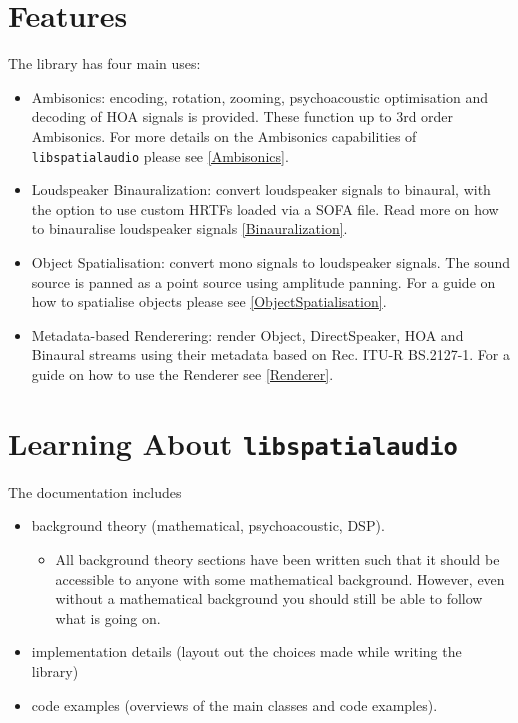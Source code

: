 \documentclass[12pt]{report}
\def\libspataud{\texttt{libspatialaudio}\xspace}
\begin{document}
\section{Features}

The library has four main uses:
\begin{itemize}
    \item Ambisonics: encoding, rotation, zooming, psychoacoustic optimisation and decoding of HOA signals is provided. These function up to 3rd order Ambisonics. For more details on the Ambisonics capabilities of \libspataud please see \cref{Ambisonics}.
    \item Loudspeaker Binauralization: convert loudspeaker signals to binaural, with the option to use custom HRTFs loaded via a SOFA file. Read more on how to binauralise loudspeaker signals \cref{Binauralization}.
    \item Object Spatialisation: convert mono signals to loudspeaker signals. The sound source is panned as a point source using amplitude panning. For a guide on how to spatialise objects please see \cref{ObjectSpatialisation}.
    \item Metadata-based Renderering: render Object, DirectSpeaker, HOA and Binaural streams using their metadata based on Rec. ITU-R BS.2127-1. For a guide on how to use the Renderer see \cref{Renderer}.
\end{itemize}

\section{Learning About \libspataud}

The documentation includes
\begin{itemize}
\item background theory (mathematical, psychoacoustic, DSP).
\begin{itemize}
\item All background theory sections have been written such that it should be accessible to anyone with some mathematical background.
However, even without a mathematical background you should still be able to follow what is going on.
\end{itemize}
\item implementation details (layout out the choices made while writing the library)
\item code examples (overviews of the main classes and code examples).
\end{itemize}
\end{document}
